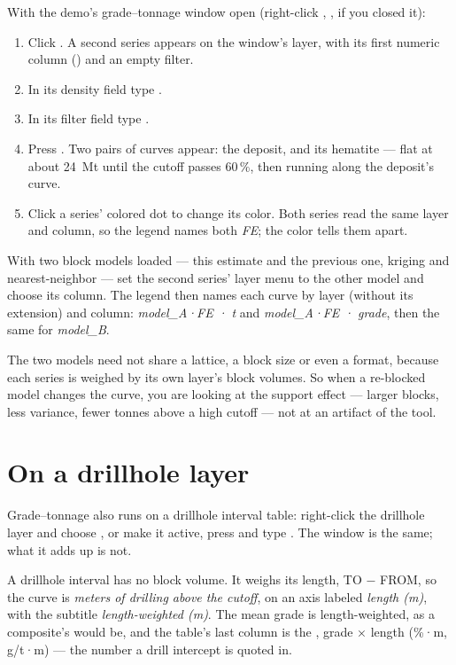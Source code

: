 \begin{tryit}
With the demo's grade–tonnage window open (right-click , , if you closed it):
\begin{enumerate}
\item Click . A second series appears on the window's layer, with its first numeric column () and an empty filter.
\item In its density field type .
\item In its filter field type .
\item Press . Two pairs of curves appear: the deposit, and its hematite — flat at about 24~Mt until the cutoff passes 60\,\%, then running along the deposit's curve.
\item Click a series' colored dot to change its color. Both series read the same layer and column, so the legend names both \emph{FE}; the color tells them apart.
\end{enumerate}
\end{tryit}

With two block models loaded — this estimate and the previous one, kriging and nearest-neighbor — set the second series' layer menu to the other model and choose its column. The legend then names each curve by layer (without its extension) and column: \emph{model\_A·FE · t} and \emph{model\_A·FE · grade}, then the same for \emph{model\_B}.

The two models need not share a lattice, a block size or even a format, because each series is weighed by its own layer's block volumes. So when a re-blocked model changes the curve, you are looking at the support effect — larger blocks, less variance, fewer tonnes above a high cutoff — not at an artifact of the tool.

\section{On a drillhole layer}\label{sec:gt-holes}
Grade–tonnage also runs on a drillhole interval table: right-click the drillhole layer and choose , or make it active, press  and type . The window is the same; what it adds up is not.

A drillhole interval has no block volume. It weighs its length, TO − FROM, so the curve is \emph{meters of drilling above the cutoff}, on an axis labeled \emph{length (m)}, with the subtitle \emph{length-weighted (m)}. The mean grade is length-weighted, as a composite's would be, and the table's last column is the , grade × length (\%·m, g/t·m) — the number a drill intercept is quoted in.

